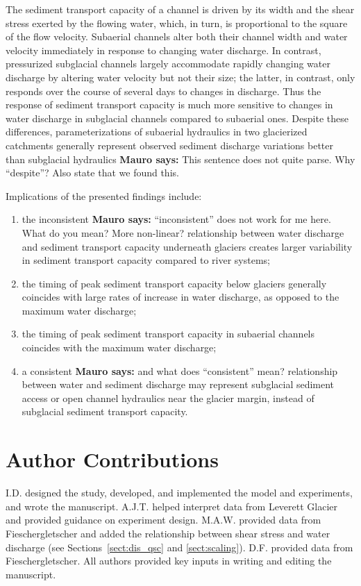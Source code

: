 \documentclass[draft]{agujournal2019}
\newcommand{\mauro}[1]{{\textbf{\color{green}Mauro says:} \color{green} #1} }
\begin{document}
The sediment transport capacity of a channel is driven by its width and the shear stress exerted by the flowing water, which, in turn, is proportional to the square of the flow velocity.
Subaerial channels alter both their channel width and water velocity immediately in response to changing water discharge.
In contrast, pressurized subglacial channels largely accommodate rapidly changing water discharge by altering water velocity but not their size; the latter, in contrast, only responds over the course of several days to changes in discharge.
Thus the response of sediment transport capacity is much more sensitive to changes in water discharge in subglacial channels compared to subaerial ones.
Despite these differences, parameterizations of subaerial hydraulics in two glacierized catchments generally represent observed sediment discharge variations better than subglacial hydraulics \mauro{This sentence does not quite parse.  Why ``despite''?  Also state that we found this.}

Implications of the presented findings include:
\begin{enumerate}
\item the inconsistent \mauro{``inconsistent'' does not work for me here. What do you mean? More non-linear?} relationship between water discharge and sediment transport capacity underneath glaciers creates larger variability in sediment transport capacity compared to river systems;
\item the timing of peak sediment transport capacity below glaciers generally coincides with large rates of increase in water discharge, as opposed to the maximum water discharge;
\item the timing of peak sediment transport capacity in subaerial channels coincides with the maximum water discharge;
\item a consistent \mauro{and what does ``consistent'' mean?} relationship between water and sediment discharge may represent subglacial sediment access or open channel hydraulics near the glacier margin, instead of subglacial sediment transport capacity.
\end{enumerate}

\section*{Author Contributions}

I.D. designed the study, developed, and implemented the model and experiments, and wrote the manuscript.
A.J.T. helped interpret data from Leverett Glacier and provided guidance on experiment design.
M.A.W. provided data from Fieschergletscher and added the relationship between shear stress and water discharge (see Sections~\ref{sect:dis_qsc} and \ref{sect:scaling}).
D.F. provided data from Fieschergletscher.
All authors provided  key inputs in writing and editing the manuscript.
\end{document}
